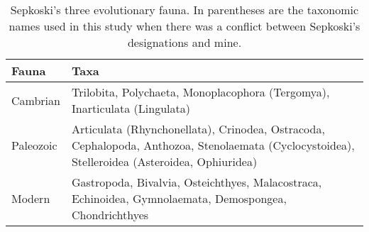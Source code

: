 \documentclass[12pt,letterpaper]{article}
\begin{document}
\begin{table}
  \centering
  \begin{tabular}{l | p{}}
    \hline
    Fauna & Taxa \\
    \hline
    \hline
    Cambrian & Trilobita, Polychaeta, Monoplacophora (Tergomya), Inarticulata (Lingulata)\\[0.1cm]
    Paleozoic & Articulata (Rhynchonellata), Crinodea, Ostracoda, Cephalopoda, Anthozoa, Stenolaemata (Cyclocystoidea), Stelleroidea (Asteroidea, Ophiuridea) \\[0.1cm]
    Modern & Gastropoda, Bivalvia, Osteichthyes, Malacostraca, Echinoidea, Gymnolaemata, Demospongea, Chondrichthyes \\
    \hline
  \end{tabular}
  \caption{Sepkoski's three evolutionary fauna. In parentheses are the taxonomic names used in this study when there was a conflict between Sepkoski's designations and mine.}
  \label{tab:sepkoski}
\end{table}
\end{document}
